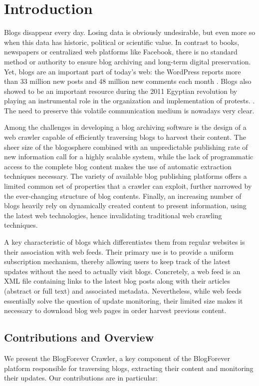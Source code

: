 \section{Introduction}

Blogs disappear every day. Losing data is obviously undesirable, but even more so when this data has historic, political or scientific value. In contrast to books, newspapers or centralized web platforms like Facebook, there is no standard method or authority to ensure blog archiving and long-term digital preservation. Yet, blogs are an important part of today's web: the WordPress reports more than 33 million new posts and 48 million new comments each month \cite{wordpress2014}. Blogs also showed to be an important resource during the 2011 Egyptian revolution by playing an instrumental role in the organization and implementation of protests. \cite{nahedeltantawy2012}. The need to preserve this volatile communication medium is nowadays very clear.

Among the challenges in developing a blog archiving software is the design of a web crawler capable of efficiently traversing blogs to harvest their content. The sheer size of the blogosphere combined with an unpredictable publishing rate of new information call for a highly scalable system, while the lack of programmatic access to the complete blog content makes the use of automatic extraction techniques necessary. The variety of available blog publishing platforms offers a limited common set of properties that a crawler can exploit, further narrowed by the ever-changing structure of blog contents. Finally, an increasing number of blogs heavily rely on dynamically created content to present information, using the latest web technologies, hence invalidating traditional web crawling techniques.

A key characteristic of blogs which differentiates them from regular websites is their association with web feeds. Their primary use is to provide a uniform subscription mechanism, thereby allowing users to keep track of the latest updates without the need to actually visit blogs. Concretely, a web feed is an XML file containing links to the latest blog posts along with their articles (abstract or full text) and associated metadata. Nevertheless, while web feeds essentially solve the question of update monitoring, their limited size makes it necessary to download blog web pages in order harvest previous content.


\subsection{Contributions and Overview}
We present the BlogForever Crawler, a key component of the BlogForever platform responsible for traversing blogs, extracting their content and monitoring their updates. Our contributions are in particular:

